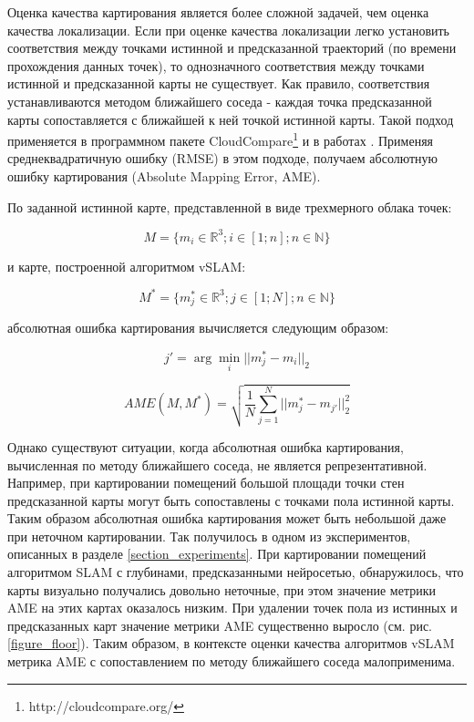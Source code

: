 \documentclass{mipt-thesis-ms}
\begin{document}
	Оценка качества картирования является более сложной задачей, чем оценка качества локализации. Если при оценке качества локализации легко установить соответствия между точками истинной и предсказанной траекторий (по времени прохождения данных точек), то однозначного соответствия между точками истинной и предсказанной карты не существует. Как правило, соответствия устанавливаются методом ближайшего соседа - каждая точка предсказанной карты сопоставляется с ближайшей к ней точкой истинной карты. Такой подход применяется в программном пакете CloudCompare\footnote{http://cloudcompare.org/} и в работах \cite{handa2014benchmark}\cite{wasenmuller2016corbs}. Применяя среднеквадратичную ошибку (RMSE) в этом подходе, получаем абсолютную ошибку картирования (Absolute Mapping Error, AME).
	
	По заданной истинной карте, представленной в виде трехмерного облака точек:
	
	\begin{equation}
	M=\{m_i \in \mathbb{R}^3; i \in [1;n]; n \in \mathbb{N}\}
	\label{eq_vslam_map}
	\end{equation}
	
	и карте, построенной алгоритмом vSLAM:
	
	\begin{equation}
	M^*=\{m^*_j \in \mathbb{R}^3; j \in [1;N]; n \in \mathbb{N}\}
	\label{eq_gt_map}
	\end{equation}
	
	абсолютная ошибка картирования вычисляется следующим образом:
	
	$$j' = \arg\min\limits_{i} ||m^*_j - m_{i}||_2$$
	
	\begin{equation}
		\label{eq_ame}		
		AME(M, M^*) = \sqrt{\frac{1}{N} \sum\limits_{j=1}^N ||m^*_j  - m_{j'}||_2^2}
	\end{equation}
	
	Однако существуют ситуации, когда абсолютная ошибка картирования, вычисленная по методу ближайшего соседа, не является репрезентативной. Например, при картировании помещений большой площади точки стен предсказанной карты могут быть сопоставлены с точками пола истинной карты. Таким образом абсолютная ошибка картирования может быть небольшой даже при неточном картировании. Так получилось в одном из экспериментов, описанных в разделе \ref{section_experiments}. При картировании помещений алгоритмом SLAM с глубинами, предсказанными нейросетью, обнаружилось, что карты визуально получались довольно неточные, при этом значение метрики AME на этих картах оказалось низким. При удалении точек пола из истинных и предсказанных карт значение метрики AME существенно выросло (см. рис. \ref{figure_floor}). Таким образом, в контексте оценки качества алгоритмов vSLAM метрика AME с сопоставлением по методу ближайшего соседа малоприменима.
	
\end{document}
